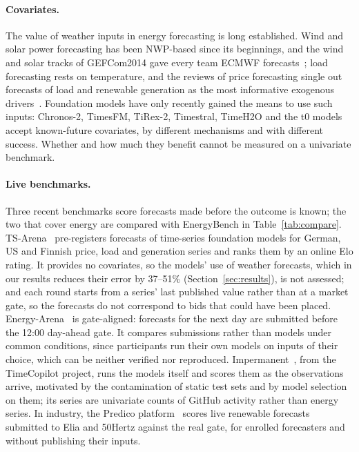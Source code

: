 \documentclass[11pt,a4paper]{article}
\begin{document}
\paragraph{Covariates.} The value of weather inputs in energy forecasting is long established. Wind and solar power
forecasting has been NWP-based since its beginnings, and the wind and solar tracks of GEFCom2014 gave every team ECMWF
forecasts~\cite{gefcom}; load forecasting rests on temperature, and the reviews of price forecasting single out
forecasts of load and renewable generation as the most informative exogenous drivers~\cite{weron,lago,hongreview}.
Foundation models have only recently gained the means to use such inputs: Chronos-2, TimesFM, TiRex-2, Timestral, TimeH2O and
the t0 models accept known-future covariates, by different mechanisms and with different success. Whether and how much they
benefit cannot be measured on a univariate benchmark.

\paragraph{Live benchmarks.} Three recent benchmarks score forecasts made before the outcome is known; the two that
cover energy are compared with EnergyBench in Table~\ref{tab:compare}. TS-Arena~\cite{tsarena} pre-registers forecasts
of time-series foundation models for German, US and Finnish price, load and generation series and ranks them by an
online Elo rating. It provides no covariates, so the models' use of weather forecasts, which in our results reduces
their error by 37--51\% (Section~\ref{sec:results}), is not assessed; and each round starts from a series' last
published value rather than at a market gate, so the forecasts do not correspond to bids that could have been placed.
Energy-Arena~\cite{energyarena} is gate-aligned: forecasts for the next day are submitted before the 12:00 day-ahead
gate. It compares submissions rather than models under common conditions, since participants run their own models on
inputs of their choice, which can be neither verified nor reproduced. Impermanent~\cite{impermanent}, from the
TimeCopilot project, runs the models itself and scores them as the observations arrive, motivated by the contamination
of static test sets and by model selection on them; its series are univariate counts of GitHub activity rather than
energy series. In industry, the Predico platform~\cite{predico} scores live renewable forecasts submitted to Elia and
50Hertz against the real gate, for enrolled forecasters and without publishing their inputs.
\end{document}
